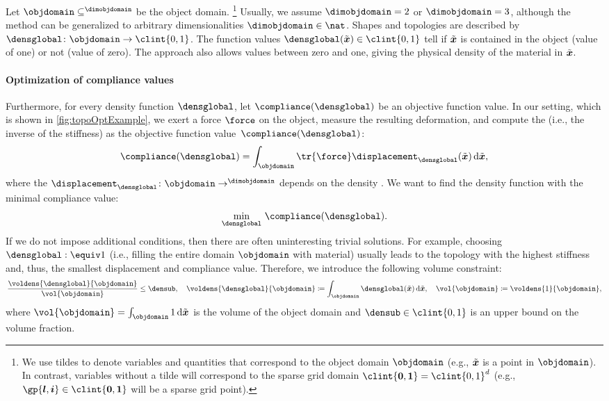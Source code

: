 Let $\objdomain \subset \real^{\dimobjdomain}$ be the object domain.%
\footnote{%
  We use tildes to denote variables and quantities
  that correspond to the object domain $\objdomain$
  (e.g., $\tilde{{\boldsymbol{x}}}$ is a point in $\objdomain$).
  In contrast, variables without a tilde will correspond
  to the sparse grid domain $\clint{\*0, \*1} = \clint{0, 1}^d$
  (e.g., $\gp{\*l,\*i} \in \clint{\*0, \*1}$ will be a sparse grid point).%
}
Usually, we assume $\dimobjdomain = 2$ or $\dimobjdomain = 3$,
although the method can be generalized to
arbitrary dimensionalities $\dimobjdomain \in \nat$.
Shapes and topologies are described by 
$\densglobal\colon \objdomain \to \clint{0, 1}$.
The function values $\densglobal(\tilde{\*x}) \in \clint{0, 1}$
tell if $\tilde{{\boldsymbol{x}}}$ is contained in the object (value of one) or
not (value of zero).
The  approach also allows values between
zero and one, giving the physical density of the material in $\tilde{{\boldsymbol{x}}}$.

\paragraph{Optimization of compliance values}

Furthermore, for every density function $\densglobal$,
let $\compliance(\densglobal)$ be an objective function value.
In our setting, which is shown in \cref{fig:topoOptExample},
we exert a force $\force$ on the object,
measure the resulting deformation, and
compute the  (i.e., the inverse of the stiffness) as
the objective function value~$\compliance(\densglobal)$:
\begin{equation}
  \compliance(\densglobal)
  = \int_{\objdomain} \tr{\force} \displacement_{\densglobal}(\tilde{\*x})
  \diff\tilde{\*x},
\end{equation}
where the 
$\displacement_{\densglobal}\colon \objdomain \to \real^{\dimobjdomain}$
depends on the density \cite{Huebner14Mehrdimensionale}.
We want to find the density function
with the minimal compliance value:
\begin{equation}
  \label{eq:topoOptProblemContinuous}
  \min_{\densglobal}\, \compliance(\densglobal).
\end{equation}
If we do not impose additional conditions,
then there are often uninteresting trivial solutions.
For example, choosing $\densglobal :\equiv 1$
(i.e., filling the entire domain $\objdomain$ with material)
usually leads to the topology with the
highest stiffness and, thus, the smallest displacement and compliance value.
Therefore, we introduce the following volume constraint:
\begin{equation}
  \frac{\voldens{\densglobal}{\objdomain}}{\vol{\objdomain}} \le \densub,\quad
  \voldens{\densglobal}{\objdomain}
  \ceq \int_{\objdomain} \densglobal(\tilde{\*x}) \diff\tilde{\*x},\quad
  \vol{\objdomain}
  \ceq \voldens{1}{\objdomain},
\end{equation}
where $\vol{\objdomain} = \int_{\objdomain} 1 \diff\tilde{\*x}$
is the volume of the object domain and
$\densub \in \clint{0, 1}$ is an upper bound on the volume fraction.

